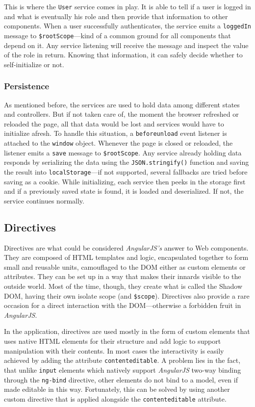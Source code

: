 \documentclass[thesis=M,english,hidelinks]{FITthesis}[2012/10/20]
\newcommand{\code}{\texttt}
\begin{document}
This is where the \code{User} service comes in play. It is able to tell if a user is logged in and what is eventually his role and then provide that information to other components. When a user successfully authenticates, the service emits a \code{loggedIn} message to \code{\$rootScope}---kind of a common ground for all components that depend on it. Any service listening will receive the message and inspect the value of the role in return. Knowing that information, it can safely decide whether to self-initialize or not.

    \subsubsection{Persistence}

As mentioned before, the services are used to hold data among different states and controllers. But if not taken care of, the moment the browser refreshed or reloaded the page, all that data would be lost and services would have to initialize afresh. To handle this situation, a \code{beforeunload} event listener is attached to the \code{window} object. Whenever the page is closed or reloaded, the listener emits a \code{save} message to \code{\$rootScope}. Any service already holding data responds by serializing the data using the \code{JSON.stringify()} function and saving the result into \code{localStorage}---if not supported, several fallbacks are tried before saving as a cookie. While initializing, each service then peeks in the storage first and if a previously saved state is found, it is loaded and deserialized. If not, the service continues normally.

  \subsection{Directives}

Directives are what could be considered \textit{AngularJS's} answer to Web components. They are composed of HTML templates and logic, encapsulated together to form small and reusable units, camouflaged to the DOM either as custom elements or attributes. They can be set up in a way that makes their innards visible to the outside world. Most of the time, though, they create what is called the Shadow DOM, having their own isolate scope (and \code{\$scope}). Directives also provide a rare occasion for a direct interaction with the DOM---otherwise a forbidden fruit in \textit{AngularJS}.

In the application, directives are used mostly in the form of custom elements that uses native HTML elements for their structure and add logic to support manipulation with their contents. In most cases the interactivity is easily achieved by adding the attribute \code{contenteditable}. A problem lies in the fact, that unlike \code{input} elements which natively support \textit{AngularJS} two-way binding through the \code{ng-bind} directive, other elements do not bind to a model, even if made editable in this way. Fortunately, this can be solved by using another custom directive that is applied alongside the \code{contenteditable} attribute.
\end{document}
